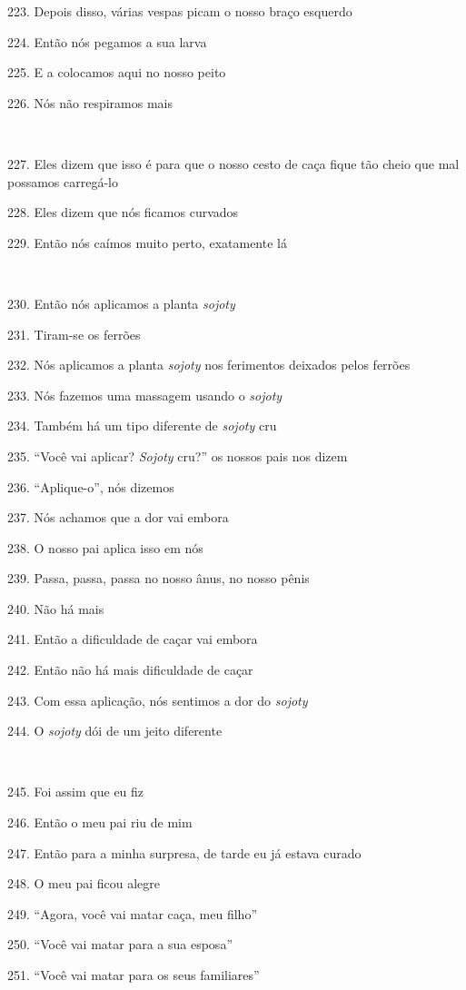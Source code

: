 223. Depois disso, várias vespas picam o nosso braço esquerdo

224. Então nós pegamos a sua larva

225. E a colocamos aqui no nosso peito

226. Nós não respiramos mais

~

227. Eles dizem que isso é para que o nosso cesto de caça fique tão cheio
que mal possamos carregá-lo

228. Eles dizem que nós ficamos curvados

229. Então nós caímos muito perto, exatamente lá

~

230. Então nós aplicamos a planta \emph{sojoty}

231. Tiram-se os ferrões

232. Nós aplicamos a planta \emph{sojoty} nos ferimentos deixados pelos
ferrões

233. Nós fazemos uma massagem usando o \emph{sojoty}

234. Também há um tipo diferente de \emph{sojoty} cru

235. ``Você vai aplicar? \emph{Sojoty} cru?'' os nossos pais nos dizem

236. ``Aplique-o'', nós dizemos

237. Nós achamos que a dor vai embora

238. O nosso pai aplica isso em nós

239. Passa, passa, passa no nosso ânus, no nosso pênis

240. Não há mais

241. Então a dificuldade de caçar vai embora

242. Então não há mais dificuldade de caçar

243. Com essa aplicação, nós sentimos a dor do \emph{sojoty}

244. O \emph{sojoty} dói de um jeito diferente

~

245. Foi assim que eu fiz

246. Então o meu pai riu de mim

247. Então para a minha surpresa, de tarde eu já estava curado

248. O meu pai ficou alegre

249. ``Agora, você vai matar caça, meu filho''

250. ``Você vai matar para a sua esposa''

251. ``Você vai matar para os seus familiares''

